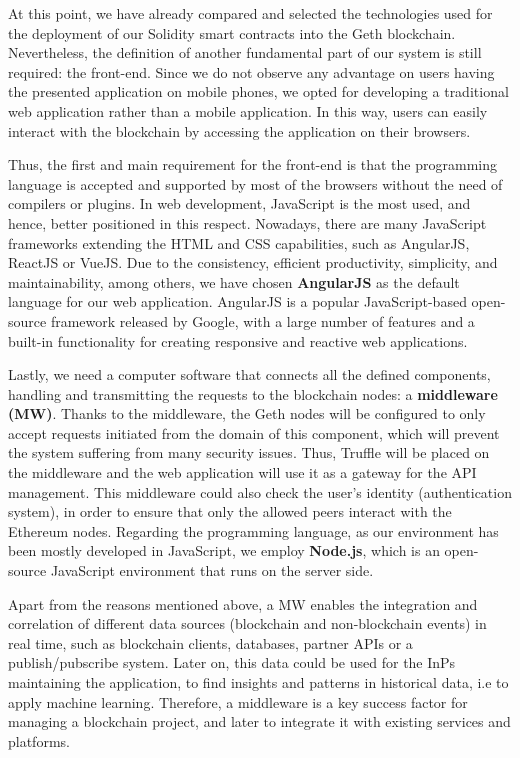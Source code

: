 At this point, we have already compared and selected the technologies used for the deployment of our Solidity smart contracts into the Geth blockchain. Nevertheless, the definition of another fundamental part of our system is still required: the front-end. Since we do not observe any advantage on users having the presented application on mobile phones, we opted for developing a traditional web application rather than a mobile application. In this way, users can easily interact with the blockchain by accessing the application on their browsers. 

Thus, the first and main requirement for the front-end is that the programming language is accepted and supported by most of the browsers without the need of compilers or plugins. In web development, JavaScript is the most used, and hence, better positioned in this respect. Nowadays, there are many JavaScript frameworks extending the HTML and CSS capabilities, such as AngularJS, ReactJS or VueJS. Due to the consistency, efficient productivity, simplicity, and maintainability, among others, we have chosen \textbf{AngularJS} as the default language for our web application. AngularJS is a popular JavaScript-based open-source framework released by Google, with a large number of features and a built-in functionality for creating responsive and reactive web applications.

Lastly, we need a computer software that connects all the defined components, handling and transmitting the requests to the blockchain nodes: a \textbf{middleware (MW)}. Thanks to the middleware, the Geth nodes will be configured to only accept requests initiated from the domain of this component, which will prevent the system suffering from many security issues. Thus, Truffle will be placed on the middleware and the web application will use it as a gateway for the API management. This middleware could also check the user's identity (authentication system), in order to ensure that only the allowed peers interact with the Ethereum nodes. Regarding the programming language, as our environment has been mostly developed in JavaScript, we employ \textbf{Node.js}, which is an open-source JavaScript environment that runs on the server side.

Apart from the reasons mentioned above, a MW enables the integration and correlation of different data sources (blockchain and non-blockchain events) in real time, such as blockchain clients, databases, partner APIs or a publish/pubscribe system. Later on, this data could be used for the InPs maintaining the application, to find insights and patterns in historical data, i.e to apply machine learning. Therefore, a middleware is a key success factor for managing a blockchain project, and later to integrate it with existing services and platforms.

